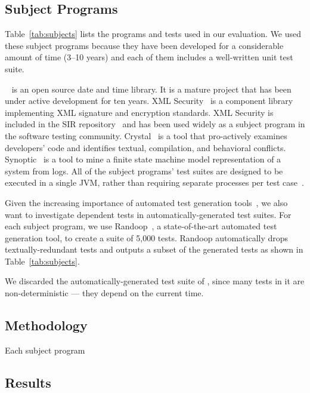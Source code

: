 \subsection{Subject Programs}

Table~\ref{tab:subjects} lists the programs and
tests used in our evaluation. We used these subject
programs because they have been developed for
a considerable amount of time (3--10 years) and each
of them includes a well-written unit test suite.

\jt~\cite{jodatime} is an open source
date and time library. It is a mature project that
has been under active development
for ten years. XML Security~\cite{xmlsecurity}
is a component library implementing XML signature and encryption
standards. XML Security is included in
the SIR repository~\cite{sir} and has been used widely
as a subject program in the software testing community.
Crystal~\cite{crystal} is a tool that
pro-actively examines developers' code and
identifies textual, compilation, and behavioral conflicts.
Synoptic~\cite{synoptic} is a tool to mine a finite state
machine model representation of a system from logs.
All of the subject programs' test suites are designed to be executed in
a single JVM, rather than requiring separate processes per test case~\cite{vmvm}.

Given the increasing importance of automated test generation
tools~\cite{PachecoLET2007, ZhangSBE2011, Csallner:2004, fraseretal:ISSTA:2011},
we also want to investigate dependent tests in automatically-generated
test suites. For each subject program, we use
Randoop~\cite{PachecoLET2007}, a state-of-the-art automated
test generation tool, to create a suite of 5,000 tests.
Randoop automatically drops textually-redundant tests 
and outputs a subset of the generated tests as
shown in Table~\ref{tab:subjects}.

We discarded the automatically-generated test suite of
\jt, since many tests in it are non-deterministic ---
they depend on the current time.


\subsection{Methodology}

Each subject program


\subsection{Results}

